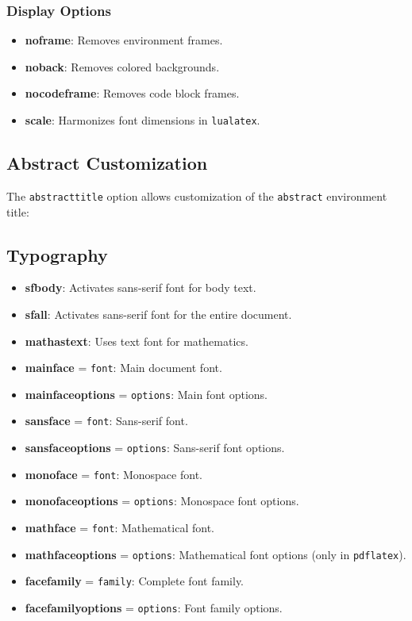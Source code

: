 \documentclass[
    margin=2cm
]{neoschool}
\begin{document}
\subsubsection{Display Options}

\begin{itemize}
\item
  \textbf{noframe}: Removes environment frames.
\item
  \textbf{noback}: Removes colored backgrounds.
\item
  \textbf{nocodeframe}: Removes code block frames.
\item
  \textbf{scale}: Harmonizes font dimensions in
  \texttt{lualatex}.
\end{itemize}

\subsection{Abstract Customization}

The \texttt{abstracttitle} option allows customization
of the \texttt{abstract} environment title:


\subsection{Typography}

\begin{itemize}
\item
  \textbf{sfbody}: Activates sans-serif font for body text.
\item
  \textbf{sfall}: Activates sans-serif font for the entire document.
\item
  \textbf{mathastext}: Uses text font for mathematics.
\item
  \textbf{mainface} = \texttt{font}: Main document
  font.
\item
  \textbf{mainfaceoptions} = \texttt{options}: Main
  font options.
\item
  \textbf{sansface} = \texttt{font}: Sans-serif font.
\item
  \textbf{sansfaceoptions} = \texttt{options}:
  Sans-serif font options.
\item
  \textbf{monoface} = \texttt{font}: Monospace font.
\item
  \textbf{monofaceoptions} = \texttt{options}:
  Monospace font options.
\item
  \textbf{mathface} = \texttt{font}: Mathematical font.
\item
  \textbf{mathfaceoptions} = \texttt{options}:
  Mathematical font options (only in
  \texttt{pdflatex}).
\item
  \textbf{facefamily} = \texttt{family}: Complete font
  family.
\item
  \textbf{facefamilyoptions} = \texttt{options}: Font
  family options.
\end{itemize}
\end{document}
